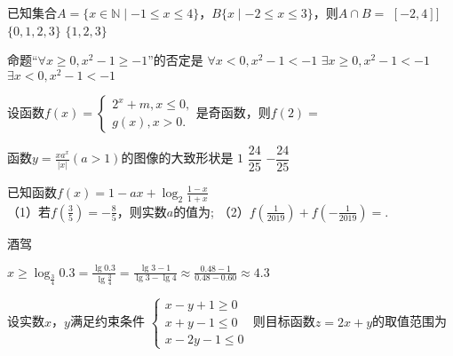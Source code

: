   \item
    已知集合$A=\{x\in\mathbb{N}\mid -1\leq x \leq 4\}$，$B\{x\mid -2\leq x \leq 3\}$，则$A\cap B=$\xz
    \xx{$[-1,3]]$}
      {$[-2,4]]$}
      {$\{0,1,2,3\}$}
      {$\{1,2,3\}$}
    \begin{answer}
      
    \end{answer}
  \item
    命题“$\forall x\geq0,x^2-1\geq-1$”的否定是\xz
      {$\forall x<0,x^2-1<-1$}
      {$\exists x\geq0,x^2-1<-1$}
      {$\exists x<0,x^2-1<-1$}
    \begin{answer}
      
    \end{answer}
  \item
    设函数$f(x)=\begin{cases}
      2^x+m,x\leqslant0,\\
      g(x),x>0.
    \end{cases}$是奇函数，则$f(2)=$\xz
    \begin{answer}
      
    \end{answer}
    \item
    函数$y=\frac{xa^x}{|x|}(a>1)$的图像的大致形状是\xz
      \xx{\texttt{[image: ]}}
       {$1$}
       {$\dfrac{24}{25}$}
       {$-\dfrac{24}{25}$}

         \item
      已知函数$f(x)=1-ax+\log_2{\frac{1-x}{1+x}}$\\
      （1）若$f\left(\frac35\right)=-\frac85$，则实数$a$的值为\tk;  
      （2）$f\left(\frac1{2019}\right)+f\left(-\frac1{2019}\right)=$\tk. 
      \item
      酒驾
      \begin{answer}
        $x\geqslant\log_{\frac34}0.3=\frac{\lg0.3}{\lg\frac34}=\frac{\lg3-1}{\lg3-\lg4}\approx\frac{0.48-1}{0.48-0.60}\approx4.3$
      \end{answer}
   \item %
      设实数$x$，$y$满足约束条件
      $\left\{\begin{aligned}
        x-y+1\geqslant0\\
        x+y-1\leqslant0\\
        x-2y-1\leqslant0
      \end{aligned}\right.$
      则目标函数$z=2x+y$的取值范围为\xz
      \xx{$[1,+\infty)$}{$[2,+\infty)$}{$[-8,1]$}{$[-8,2]$}
 
